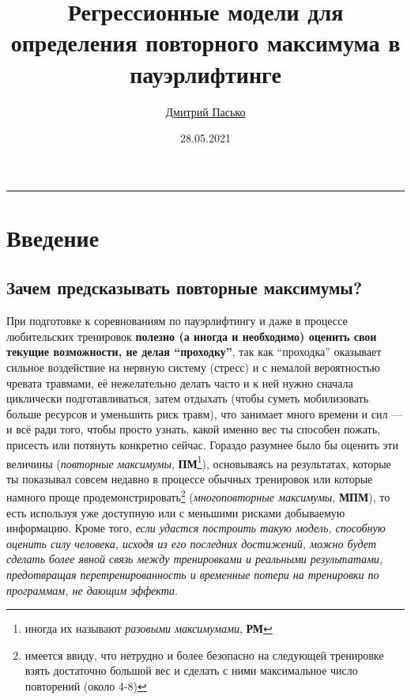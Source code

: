 \documentclass[
]{article}
\title{Регрессионные модели для определения повторного максимума в
пауэрлифтинге}
\author{\href{https://github.com/PasaOpasen}{Дмитрий Пасько}}
\date{28.05.2021}
\begin{document}
\maketitle

{
\setcounter{tocdepth}{2}
\tableofcontents
}
\begin{center}\rule{0.5\linewidth}{0.5pt}\end{center}

\hypertarget{ux432ux432ux435ux434ux435ux43dux438ux435}{%
\section{Введение}\label{ux432ux432ux435ux434ux435ux43dux438ux435}}

\hypertarget{ux437ux430ux447ux435ux43c-ux43fux440ux435ux434ux441ux43aux430ux437ux44bux432ux430ux442ux44c-ux43fux43eux432ux442ux43eux440ux43dux44bux435-ux43cux430ux43aux441ux438ux43cux443ux43cux44b}{%
\subsection{Зачем предсказывать повторные
максимумы?}\label{ux437ux430ux447ux435ux43c-ux43fux440ux435ux434ux441ux43aux430ux437ux44bux432ux430ux442ux44c-ux43fux43eux432ux442ux43eux440ux43dux44bux435-ux43cux430ux43aux441ux438ux43cux443ux43cux44b}}

При подготовке к соревнованиям по пауэрлифтингу и даже в процессе
любительских тренировок \textbf{полезно (а иногда и необходимо) оценить
свои текущие возможности, не делая ``проходку''}, так как ``проходка''
оказывает сильное воздействие на нервную систему (стресс) и с немалой
вероятностью чревата травмами, её нежелательно делать часто и к ней
нужно сначала циклически подготавливаться, затем отдыхать (чтобы суметь
мобилизовать больше ресурсов и уменьшить риск травм), что занимает много
времени и сил --- и всё ради того, чтобы просто узнать, какой именно вес
ты способен пожать, присесть или потянуть конкретно сейчас. Гораздо
разумнее было бы оценить эти величины (\emph{повторные максимумы},
\textbf{ПМ}\footnote{иногда их называют \emph{разовыми максимумами},
  \textbf{РМ}}), основываясь на результатах, которые ты показывал совсем
недавно в процессе обычных тренировок или которые намного проще
продемонстрировать\footnote{имеется ввиду, что нетрудно и более
  безопасно на следующей тренировке взять достаточно большой вес и
  сделать с ними максимальное число повторений (около 4-8)}
(\emph{многоповторные максимумы}, \textbf{МПМ}), то есть используя уже
доступную или с меньшими рисками добываемую информацию. Кроме того,
\emph{если удастся построить такую модель, способную оценить силу
человека, исходя из его последних достижений, можно будет сделать более
явной связь между тренировками и реальными результатами, предотвращая
перетренированность и временные потери на тренировки по программам, не
дающим эффекта}.
\end{document}
